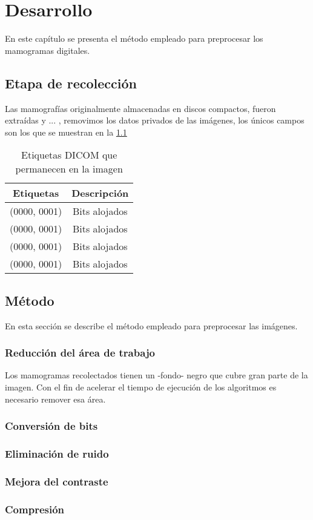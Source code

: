 \chapter{Desarrollo}
En este capítulo se presenta el método empleado para preprocesar los mamogramas
digitales.



\section{Etapa de recolección}
Las mamografías originalmente almacenadas en discos compactos, fueron extraídas
y ... , removimos los datos privados de las imágenes, los únicos campos son los
que se muestran en la \ref{table:dicomtags} 

\begin{table}[h]
  \caption{Etiquetas DICOM que permanecen en la imagen} 
  \label{table:dicomtags}
\begin{center}
{\small
    \begin{tabular}{c|c}
    \hline

    {\bf Etiquetas} & 
    {\bf Descripción} \\
    \hline
           (0000, 0001) & Bits alojados \\
           (0000, 0001) & Bits alojados \\
           (0000, 0001) & Bits alojados \\
           (0000, 0001) & Bits alojados \\
    \hline
    \end{tabular}
}
\end{center}
\end{table}


\section{Método}
En esta sección se describe el método empleado para preprocesar las imágenes.

\subsection{Reducción del área de trabajo}
Los mamogramas recolectados tienen un -fondo- negro que cubre gran parte de la
imagen. Con el fin de acelerar el tiempo de ejecución de los algoritmos es
necesario remover esa área.

\subsection{Conversión de bits}

\subsection{Eliminación de ruido}

\subsection{Mejora del contraste}

\subsection{Compresión}

